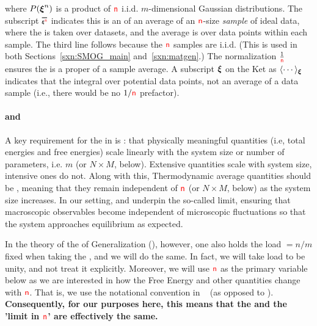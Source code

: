 where $P(\boldsymbol{\xi}^{n})$ is a product of ${\color{red}\sf{n}}$ i.i.d. $m$-dimensional Gaussian distributions.
The subscript $\AVGNDXIn$ indicates this is an
\ExpectedValue of an average of an ${\color{red}\sf{n}}$-size \emph{sample} of ideal data, where the \ExpectedValue is taken over datasets, and the average is over data points within each sample. The third line follows because the ${\color{red}\sf{n}}$ samples are i.i.d.
(This is used in both Sections~\ref{sxn:SMOG_main} and~\ref{sxn:matgen}.)
The normalization $\tfrac{1}{{\color{red}\sf{n}}}$ ensures the \BraKet is a proper \ExpectedValue of a sample average.
A subscript $\boldsymbol{\xi}$ on the Ket as $\langle\cdots\rangle_{\boldsymbol{\xi}}$ indicates that the integral over potential data points, not an average of a data sample (i.e., there would be no $1/{\color{red}\sf{n}}$ prefactor).
%

\paragraph{\SizeExtensivity and \SizeIntensivity}
A key requirement for the \ThermodynamicLimit in \STATMECH is \emph{\SizeExtensivity}:
that physically meaningful quantities (i.e, total energies and free energies)
scale linearly with the system size or number of parameters, i.e. $m$ (or $N\times M$, below).
Extensive quantities scale with system size, intensive ones do not.
Along with this, Thermodynamic average quantities should be \emph{\SizeIntensive},
meaning that they remain independent of ${\color{red}\sf{n}}$ (or $N\times M$, below) as the system size increases.
In our setting, \SizeExtensivity and \SizeIntensivity underpin the so-called \LargeN limit,
ensuring that macroscopic observables become independent of
microscopic fluctuations so that the system approaches equilibrium as expected.

In the theory of the \StatisticalMechanics of Generalization (\SMOG), however, one also holds the load $=n/m$ fixed when taking the \ThermodynamicLimit, and we will do the same\cite{Gardner_1985, SST92, engel2001statistical,MM17_TR}. In fact, we will take load to be unity, and not treat it explicitly. 
Moreover,  we will use ${\color{red}\sf{n}}$  as the primary variable below as we are interested in how the Free Energy and other quantities change with ${\color{red}\sf{n}}$. That is, we use the notational convention in ~\cite{Solla2023} (as opposed to \cite{SST92}). \textbf{Consequently, for our purposes here, this means that the \ThermodynamicLimit and the '\LargeN limit in ${\color{red}\sf{n}}$' are effectively the same.}

